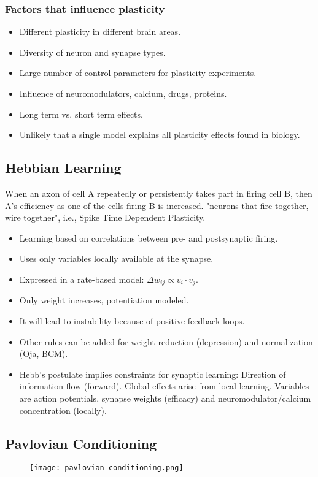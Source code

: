 \documentclass[main]{subfiles}
\begin{document}
\subsubsection{Factors that influence plasticity}
\begin{itemize}[noitemsep,nolistsep]
	\item Different plasticity in different brain areas.
	\item Diversity of neuron and synapse types.
	\item Large number of control parameters for plasticity experiments.
	\item Influence of neuromodulators, calcium, drugs, proteins.
	\item Long term vs. short term effects.
	\item Unlikely that a single model explains all plasticity effects found in biology.
\end{itemize}

\subsection{Hebbian Learning}

When an axon of cell A repeatedly or persistently takes part in firing cell B, then A's efficiency as one of the cells firing B is increased.
"neurons that fire together, wire together", i.e., Spike Time Dependent Plasticity.

\begin{itemize}[noitemsep,nolistsep]
	\item Learning based on correlations between pre- and postsynaptic firing.
	\item Uses only variables locally available at the synapse.
	\item Expressed in a rate-based model: $\Delta w_{ij}\propto v_i\cdot v_j$.
	\item Only weight increases, potentiation modeled.
	\item It will lead to instability because of positive feedback loops.
	\item Other rules can be added for weight reduction (depression) and normalization (Oja, BCM).
	\item Hebb's postulate implies constraints for synaptic learning:
	\subitem Direction of information flow (forward).
	\subitem Global effects arise from local learning.
	\subitem Variables are action potentials, synapse weights (efficacy) and neuromodulator/calcium concentration (locally).
\end{itemize}

\subsection{Pavlovian Conditioning}
\begin{figure}[H]
	\texttt{[image: pavlovian-conditioning.png]}
\end{figure}
\end{document}
